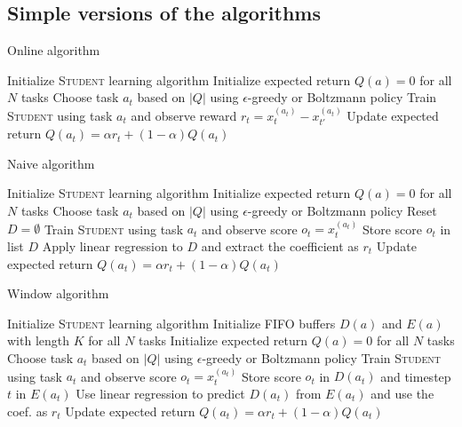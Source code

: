 \begin{appendices}

\section{Simple versions of the algorithms}
\label{appendix:simple_algs}

\begin{algorithm}
\caption{Online algorithm}\label{online_simple}
\begin{algorithmic}
\State Initialize \textsc{Student} learning algorithm
\State Initialize expected return $Q(a)=0$ for all $N$ tasks
\State Choose task $a_t$ based on $|Q|$ using $\epsilon$-greedy or Boltzmann policy
\State Train \textsc{Student} using task $a_t$ and observe reward $r_t = x_t^{(a_t)} - x_{t'}^{(a_t)}$
\State Update expected return $Q(a_t) = \alpha r_t + (1 - \alpha) Q(a_t)$
\EndFor
\end{algorithmic}
\end{algorithm}

\begin{algorithm}
\caption{Naive algorithm}\label{naive_simple}
\begin{algorithmic}
\State Initialize \textsc{Student} learning algorithm
\State Initialize expected return $Q(a)=0$ for all $N$ tasks
\State Choose task $a_t$ based on $|Q|$ using $\epsilon$-greedy or Boltzmann policy
\State Reset $D=\emptyset$
\State Train \textsc{Student} using task $a_t$ and observe score $o_t = x_t^{(a_t)}$
\State Store score $o_t$ in list $D$
\EndFor
\State Apply linear regression to $D$ and extract the coefficient as $r_t$
\State Update expected return $Q(a_t) = \alpha r_t + (1 - \alpha) Q(a_t)$
\EndFor
\end{algorithmic}
\end{algorithm}

\begin{algorithm}
\caption{Window algorithm}\label{window_simple}
\begin{algorithmic}
\State Initialize \textsc{Student} learning algorithm
\State Initialize FIFO buffers $D(a)$ and $E(a)$ with length $K$ for all $N$ tasks
\State Initialize expected return $Q(a)=0$ for all $N$ tasks
\State Choose task $a_t$ based on $|Q|$ using $\epsilon$-greedy or Boltzmann policy
\State Train \textsc{Student} using task $a_t$ and observe score $o_t = x_t^{(a_t)}$
\State Store score $o_t$ in $D(a_t)$ and timestep $t$ in $E(a_t)$
\State Use linear regression to predict $D(a_t)$ from $E(a_t)$ and use the coef. as $r_t$
\State Update expected return $Q(a_t) = \alpha r_t + (1 - \alpha) Q(a_t)$
\EndFor
\end{algorithmic}
\end{algorithm}


\end{appendices}
